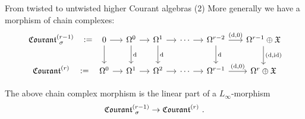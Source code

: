 \documentclass[beamer,10pt]{standalone}
\begin{document}
\begin{frame}{From twisted to untwisted higher Courant algebras (2)}
	More generally we have a morphism of chain complexes:
	\begin{displaymath}
		\begin{tikzcd}[ampersand replacement=\&,column sep = small]
			\Courant[\sigma]{r-1} \ar[r,phantom,":="] %
			\&[1em]
			0 \ar[r] \ar[d]
			\& \Omega^0 \ar[d,"\d"] \ar[r]
			\& \Omega^1 \ar[d,"\d"] \ar[r]
			\& \cdots \ar[r]
			\& \Omega^{r-2} \ar[d,"\d"] \ar[r,"{(\d,0)}"]
			\&[.5em]  \Omega^{r-1} \oplus \X \ar[d,"{(\d,\id)}"]
			\\
			\Courant{r} \ar[r,phantom,":="]
			\& \Omega^0 \ar[r]
			\& \Omega^1 \ar[r]
			\& \Omega^2 \ar[r]
			\& \cdots \ar[r]
			\& \Omega^{r-1} \ar[r,"{(\d,0)}"]
			\&\Omega^{r} \oplus \X
		\end{tikzcd}
	\end{displaymath}

	\vfill\pause

	\begin{thmblock}[{[Fiorenza-M. 2025]}]
		The above chain complex morphism is the linear part of a $L_\infty$-morphism $$\Courant[\sigma]{r-1} \to \Courant{r}~.$$
	\end{thmblock}

	\vfill
\end{frame}
\end{document}
